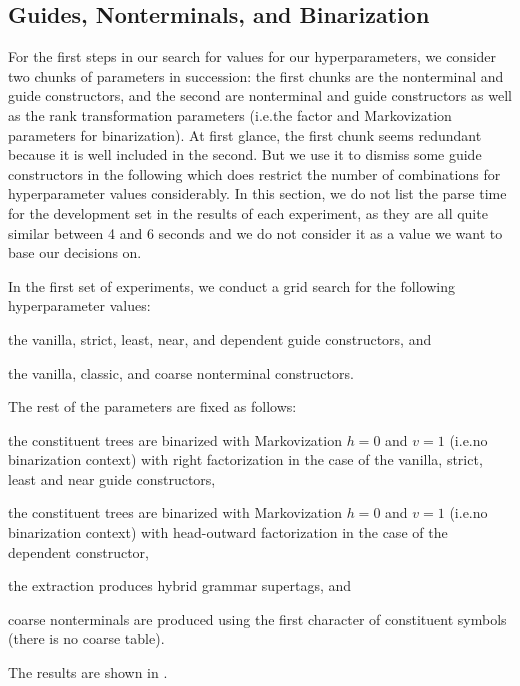 \documentclass[../../document.tex]{subfiles}
\begin{document}
    \subsection{Guides, Nonterminals, and Binarization}\label{sec:gridsearch:nts-guides}
    For the first steps in our search for values for our hyperparameters, we consider two chunks of parameters in succession: the first chunks are the nonterminal and guide constructors, and the second are nonterminal and guide constructors as well as the rank transformation parameters (i.e.\@ the factor and Markovization parameters for binarization).
    At first glance, the first chunk seems redundant because it is well included in the second.
    But we use it to dismiss some guide constructors in the following which does restrict the number of combinations for hyperparameter values considerably.
    In this section, we do not list the parse time for the development set in the results of each experiment, as they are all quite similar between 4 and 6 seconds and we do not consider it as a value we want to base our decisions on.

    In the first set of experiments, we conduct a grid search for the following hyperparameter values:
    \begin{compactitem}
        \item the vanilla, strict, least, near, and dependent guide constructors, and
        \item the vanilla, classic, and coarse nonterminal constructors.
    \end{compactitem}
    The rest of the parameters are fixed as follows:
    \begin{compactitem}
        \item the constituent trees are binarized with Markovization \(h=0\) and \(v=1\) (i.e.\@ no binarization context) with right factorization in the case of the vanilla, strict, least and near guide constructors,
        \item the constituent trees are binarized with Markovization \(h=0\) and \(v=1\) (i.e.\@ no binarization context) with head-outward factorization in the case of the dependent constructor,
        \item the extraction produces hybrid grammar supertags, and
        \item coarse nonterminals are produced using the first character of constituent symbols (there is no coarse table).
    \end{compactitem}
    The results are shown in .
    
\end{document}
